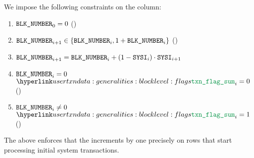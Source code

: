 We impose the following constraints on the \blockNumber{} column:
\begin{enumerate}
	\item $\texttt{BLK\_NUMBER} _{0} = 0$ (\sanityCheck)
	\item $\texttt{BLK\_NUMBER} _{i + 1} \in \{ \texttt{BLK\_NUMBER} _{i}, 1 + \texttt{BLK\_NUMBER} _{i} \}$ (\sanityCheck)
	\item $\texttt{BLK\_NUMBER} _{i + 1} = \texttt{BLK\_NUMBER} _{i} + (1 - \texttt{SYSI} _{i}) \cdot \texttt{SYSI} _{i + 1}$
	\item \If $\texttt{BLK\_NUMBER} _{i} =    0$ \Then $\transactionFlagSum _{i} = 0$ (\sanityCheck)
	\item \If $\texttt{BLK\_NUMBER} _{i} \neq 0$ \Then $\transactionFlagSum _{i} = 1$ (\sanityCheck)
\end{enumerate}
\saNote{}
The above enforces that the \blockNumber{} increments by one precisely on rows
that start processing initial system transactions.
